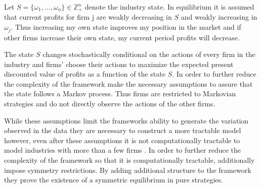 \documentclass[12pt]{article}
\begin{document}
Let $S=\{\omega_1,\dots,\omega_n\} \in \mathbb{Z}_+^n$ denote the industry state. In equilibrium it is assumed that current profits for firm j are weakly decreasing in $S$ and weakly increasing in $\omega_j$. Thus increasing my own state improves my position in the market and if other firms increase their own state, my current period profits will decrease.

The state $S$ changes stochastically conditional on the actions of every firm in the industry and firms' choose their actions to maximize the expected present discounted value of profits as a function of the state $S$. In order to further reduce the complexity of the framework \citet{1995_Erickson_Pakes_RES} make the necessary assumptions to assure that the state follows a Markov process. Thus firms are restricted to Markovian strategies and do not directly observe the actions of the other firms.


While these assumptions limit the frameworks ability to generate the variation observed in the data they are necessary to construct a more tractable model however, even after these assumptions it is not computationally tractable to model industries with more than a few firms \citep{2008_Weintraub_Benkard_VanRoy_Econometrica}. In order to further reduce the complexity of the framework so that it is computationally tractable, \citet{2010_Doraszelski_Satterthwaite_RAND} additionally impose symmetry restrictions. By adding additional structure to the framework they prove the existence of a symmetric equilibrium in pure strategies.
\end{document}
